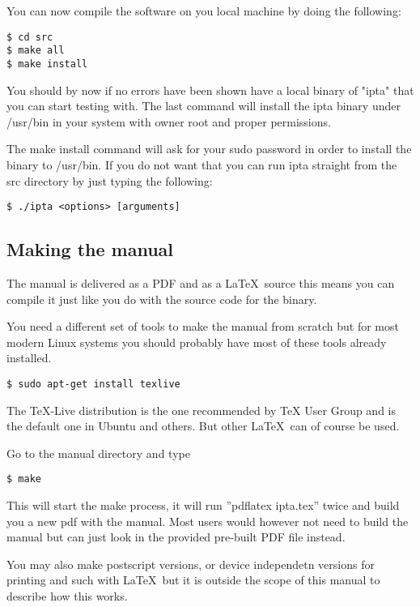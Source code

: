 \documentclass[english,twoside,openright,a4paper,12pt]{article}
\begin{document}
You can now compile the software on you local machine by doing the following:

\begin{verbatim}
$ cd src 
$ make all 
$ make install
\end{verbatim}

You should by now if no errors have been shown have a local binary of "ipta" that you can start testing with. The last command will install the ipta binary under /usr/bin in your system with owner root and proper permissions.

The make install command will ask for your sudo password in order to install the binary to /usr/bin. If you do not want that you can run ipta straight from the src directory by just typing the following:

\begin{verbatim}
$ ./ipta <options> [arguments]
\end{verbatim}

\subsection{Making the manual}

The manual is delivered as a PDF and as a \LaTeX\ source this means you can compile it just like you do with the source code for the binary.

You need a different set of tools to make the manual from scratch but for most modern Linux systems you should probably have most of these tools already installed.

\begin{verbatim}
$ sudo apt-get install texlive
\end{verbatim}

The TeX-Live distribution is the one recommended by TeX User Group and is the default one in Ubuntu and others. But other \LaTeX\ can of course be used.

Go to the manual directory and type

\begin{verbatim}
$ make
\end{verbatim}

This will start the make process, it will run ''pdflatex ipta.tex'' twice and build you a new pdf with the manual. Most users would however not need to build the manual but can just look in the provided pre-built PDF file instead.

You may also make postscript versions, or device independetn versions for printing and such with \LaTeX\ but it is outside the scope of this manual to describe how this works.
\end{document}
